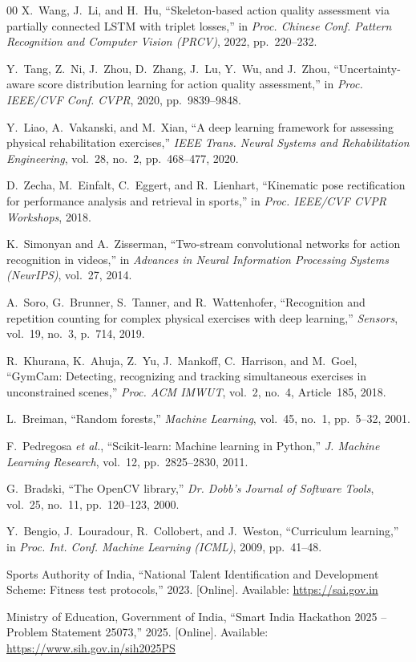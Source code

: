 \documentclass[conference]{IEEEtran}
\begin{document}
\begin{thebibliography}{00}
X.~Wang, J.~Li, and H.~Hu, ``Skeleton-based action quality assessment via partially connected LSTM with triplet losses,'' in \textit{Proc. Chinese Conf. Pattern Recognition and Computer Vision (PRCV)}, 2022, pp.~220--232.

Y.~Tang, Z.~Ni, J.~Zhou, D.~Zhang, J.~Lu, Y.~Wu, and J.~Zhou, ``Uncertainty-aware score distribution learning for action quality assessment,'' in \textit{Proc. IEEE/CVF Conf. CVPR}, 2020, pp.~9839--9848.

Y.~Liao, A.~Vakanski, and M.~Xian, ``A deep learning framework for assessing physical rehabilitation exercises,'' \textit{IEEE Trans. Neural Systems and Rehabilitation Engineering}, vol.~28, no.~2, pp.~468--477, 2020.

D.~Zecha, M.~Einfalt, C.~Eggert, and R.~Lienhart, ``Kinematic pose rectification for performance analysis and retrieval in sports,'' in \textit{Proc. IEEE/CVF CVPR Workshops}, 2018.

K.~Simonyan and A.~Zisserman, ``Two-stream convolutional networks for action recognition in videos,'' in \textit{Advances in Neural Information Processing Systems (NeurIPS)}, vol.~27, 2014.

A.~Soro, G.~Brunner, S.~Tanner, and R.~Wattenhofer, ``Recognition and repetition counting for complex physical exercises with deep learning,'' \textit{Sensors}, vol.~19, no.~3, p.~714, 2019.

R.~Khurana, K.~Ahuja, Z.~Yu, J.~Mankoff, C.~Harrison, and M.~Goel, ``GymCam: Detecting, recognizing and tracking simultaneous exercises in unconstrained scenes,'' \textit{Proc. ACM IMWUT}, vol.~2, no.~4, Article~185, 2018.

L.~Breiman, ``Random forests,'' \textit{Machine Learning}, vol.~45, no.~1, pp.~5--32, 2001.

F.~Pedregosa \textit{et al.}, ``Scikit-learn: Machine learning in Python,'' \textit{J. Machine Learning Research}, vol.~12, pp.~2825--2830, 2011.

G.~Bradski, ``The OpenCV library,'' \textit{Dr. Dobb's Journal of Software Tools}, vol.~25, no.~11, pp.~120--123, 2000.

Y.~Bengio, J.~Louradour, R.~Collobert, and J.~Weston, ``Curriculum learning,'' in \textit{Proc. Int. Conf. Machine Learning (ICML)}, 2009, pp.~41--48.

Sports Authority of India, ``National Talent Identification and Development Scheme: Fitness test protocols,'' 2023. [Online]. Available: \url{https://sai.gov.in}

Ministry of Education, Government of India, ``Smart India Hackathon 2025 -- Problem Statement 25073,'' 2025. [Online]. Available: \url{https://www.sih.gov.in/sih2025PS}

\end{thebibliography}
\end{document}
